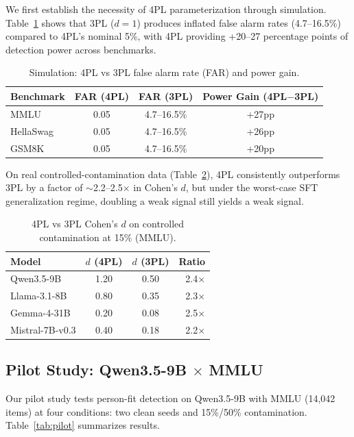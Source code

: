 \documentclass[11pt]{article}
\begin{document}
We first establish the necessity of 4PL parameterization through simulation. Table~\ref{tab:4pl_simulation} shows that 3PL ($d=1$) produces inflated false alarm rates (4.7--16.5\%) compared to 4PL's nominal 5\%, with 4PL providing +20--27 percentage points of detection power across benchmarks.

\begin{table}[h]
\centering
\caption{Simulation: 4PL vs 3PL false alarm rate (FAR) and power gain.}
\label{tab:4pl_simulation}
\begin{tabular}{lccc}
\toprule
Benchmark & FAR (4PL) & FAR (3PL) & Power Gain (4PL$-$3PL) \\
\midrule
MMLU & 0.05 & 4.7--16.5\% & +27pp \\
HellaSwag & 0.05 & 4.7--16.5\% & +26pp \\
GSM8K & 0.05 & 4.7--16.5\% & +20pp \\
\bottomrule
\end{tabular}
\end{table}

On real controlled-contamination data (Table~\ref{tab:4pl_real}), 4PL consistently outperforms 3PL by a factor of $\sim$2.2--2.5$\times$ in Cohen's $d$, but under the worst-case SFT generalization regime, doubling a weak signal still yields a weak signal.

\begin{table}[h]
\centering
\caption{4PL vs 3PL Cohen's $d$ on controlled contamination at 15\% (MMLU).}
\label{tab:4pl_real}
\begin{tabular}{lccr}
\toprule
Model & $d$ (4PL) & $d$ (3PL) & Ratio \\
\midrule
Qwen3.5-9B & 1.20 & 0.50 & 2.4$\times$ \\
Llama-3.1-8B & 0.80 & 0.35 & 2.3$\times$ \\
Gemma-4-31B & 0.20 & 0.08 & 2.5$\times$ \\
Mistral-7B-v0.3 & 0.40 & 0.18 & 2.2$\times$ \\
\bottomrule
\end{tabular}
\end{table}

\subsection{Pilot Study: Qwen3.5-9B $\times$ MMLU}
\label{sec:pilot}

Our pilot study tests person-fit detection on Qwen3.5-9B with MMLU (14,042 items) at four conditions: two clean seeds and 15\%/50\% contamination. Table~\ref{tab:pilot} summarizes results.
\end{document}
